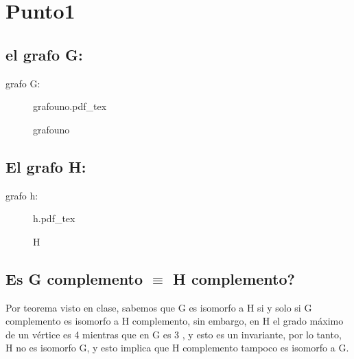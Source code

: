 \documentclass[10pt,a4paper]{article} %
\newcommand{\incfig}[1]{%
    \def\svgwidth{\columnwidth}
    {#1.pdf_tex}
}
\begin{document}
    \title{\rmfamily\normalfont{}}
    \author{}
    \date{\today}

    \maketitle


    \section{Punto1}
        \subsection{el grafo G:}
            grafo G:
            \begin{figure}[h]
                \centering
                \incfig{grafouno}
                \caption{grafouno}
                \label{fig:G}
            \end{figure}
        \subsection{El grafo H:}
            grafo h:
            \begin{figure}[h]
                \centering
                \incfig{h}
                \caption{H}
                \label{fig:h}
            \end{figure}
        \subsection{Es G complemento $ \equiv   $  H complemento?}
            Por teorema visto en clase, sabemos que G es isomorfo a H si y solo
            si G complemento es isomorfo a H complemento, sin embargo, en H el
            grado máximo de un vértice es 4 mientras que en G es 3 , y esto es
            un invariante, por lo tanto, H no es isomorfo  G, y esto implica
            que H complemento tampoco es isomorfo a G.
\end{document}
